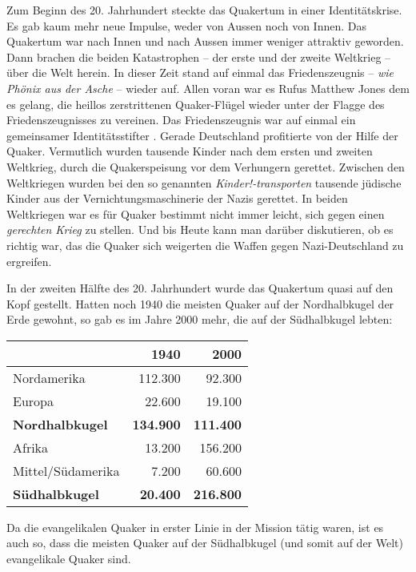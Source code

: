 Zum Beginn des 20. Jahrhundert steckte das Quakertum in einer Identitätskrise.
Es gab kaum mehr neue Impulse, weder von Aussen noch von Innen. Das Quakertum
war
nach Innen und nach Aussen immer weniger attraktiv geworden. Dann brachen die
beiden Katastrophen -- der erste und der zweite Weltkrieg --
über die Welt
herein. In dieser Zeit stand auf einmal das Friedenszeugnis
 -- \textit{wie
Phönix aus der Asche} -- wieder auf. Allen voran war es Rufus Matthew Jones
 dem
es gelang, die heillos zerstrittenen Quaker-Flügel wieder unter der Flagge des
Friedenszeugnisses zu vereinen. Das Friedenszeugnis war auf einmal ein
gemeinsamer Identitätsstifter . Gerade Deutschland
 profitierte von der Hilfe der
Quaker. Vermutlich wurden tausende Kinder nach dem ersten und zweiten Weltkrieg,
durch die Quakerspeisung  vor dem Verhungern gerettet.
Zwischen den Weltkriegen
wurden bei den so genannten \textit{Kinder!-transporten} 
tausende jüdische Kinder 
aus der Vernichtungsmaschinerie der Nazis gerettet. In beiden Weltkriegen war es
für Quaker bestimmt nicht immer leicht, sich gegen einen \textit{gerechten
Krieg} zu stellen. Und bis Heute kann man darüber diskutieren, ob es richtig
war, das die Quaker sich weigerten die Waffen gegen Nazi-Deutschland zu
ergreifen.

\medskip

In der zweiten Hälfte des 20. Jahrhundert wurde das Quakertum quasi auf den Kopf
gestellt. Hatten noch 1940 die meisten Quaker auf der Nordhalbkugel der Erde
gewohnt, so gab es im Jahre 2000 mehr, die auf der Südhalbkugel lebten:

\begin{center}
\begin{tabular}{|l|r|r|} \hline
                        & \textbf{1940}        & \textbf{2000}    \\ \hline
\hline
Nordamerika             & 112.300              & 92.300           \\ \hline
Europa                  & 22.600               & 19.100           \\ \hline
\textbf{Nordhalbkugel}  & \textbf{134.900}     & \textbf{111.400} \\ \hline
Afrika                  & 13.200               & 156.200          \\ \hline
Mittel/Südamerika       & 7.200                & 60.600           \\ \hline
\textbf{Südhalbkugel}   & \textbf{20.400}      & \textbf{216.800} \\ \hline
\end{tabular}
\end{center}


Da die evangelikalen Quaker in erster Linie in der Mission tätig waren, ist es
auch so, dass die meisten Quaker auf der Südhalbkugel (und somit auf der Welt)
evangelikale Quaker sind.